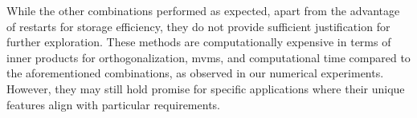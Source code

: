 While the other combinations performed as expected, apart from the advantage of restarts for storage efficiency, they do not provide sufficient justification for further exploration. These methods are computationally expensive in terms of inner products for orthogonalization, mvms, and computational time compared to the aforementioned combinations, as observed in our numerical experiments. However, they may still hold promise for specific applications where their unique features align with particular requirements.